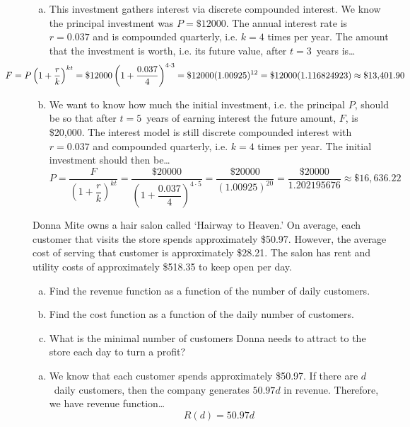 \documentclass[12pt,letterpaper]{exam}
\begin{document}
\begin{questions}
{\itshape
\sol 
\begin{enumerate}[(a)]
\item This investment gathers interest via discrete compounded interest. We know the principal investment was $P= \$12000$. The annual interest rate is $r= 0.037$ and is compounded quarterly, i.e. $k= 4$ times per year. The amount that the investment is worth, i.e. its future value, after $t= 3$~years is\dots
	\[
	\hspace{-1.75cm} F= P \left(1 + \dfrac{r}{k} \right)^{kt}= \$12000 \left(1 + \dfrac{0.037}{4} \right)^{4 \cdot 3}= \$12000 (1.00925)^{12}= \$12000(1.116824923) \approx \$13,\!401.90
	\] \pspace

\item We want to know how much the initial investment, i.e. the principal $P$, should be so that after $t= 5$~years of earning interest the future amount, $F$, is \$20,000. The interest model is still discrete compounded interest with $r= 0.037$ and compounded quarterly, i.e. $k= 4$ times per year. The initial investment should then be\dots
	\[
	P= \dfrac{F}{\left(1 + \dfrac{r}{k} \right)^{kt}}= \dfrac{\$20000}{\left(1 + \dfrac{0.037}{4} \right)^{4 \cdot 5}}= \dfrac{\$20000}{(1.00925)^{20}}= \dfrac{\$20000}{1.202195676} \approx \$16,\!636.22
	\]
\end{enumerate}
}



\newpage
\question[10] Donna Mite owns a hair salon called `Hairway to Heaven.' On average, each customer that visits the store spends approximately \$50.97. However, the average cost of serving that customer is approximately \$28.21. The salon has rent and utility costs of approximately \$518.35 to keep open per day. 
	\begin{enumerate}[(a)]
	\item Find the revenue function as a function of the number of daily customers. 
	\item Find the cost function as a function of the daily number of customers. 
	\item What is the minimal number of customers Donna needs to attract to the store each day to turn a profit? 
	\end{enumerate} \pspace

{\itshape
\sol 
\begin{enumerate}[(a)]
\item We know that each customer spends approximately \$50.97. If there are $d$~daily customers, then the company generates $50.97d$ in revenue. Therefore, we have revenue function\dots
	\[
	R(d)= 50.97d
	\] \pspace


\end{enumerate}}
\end{questions}
\end{document}
